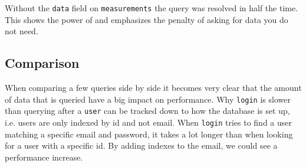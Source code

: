 Without the \verb+data+ field on \verb+measurements+ the query was resolved in half the time. 
This shows the power of  and emphasizes the penalty of asking for data you do not need.


\subsection{Comparison}
When comparing a few queries side by side it becomes very clear that the amount of data that is queried have a big impact on performance. 
Why \verb+login+ is slower than querying after a \verb+user+ can be tracked down to how the database is set up, i.e. users are only indexed by id and not email.
When \verb+login+ tries to find a user matching a specific email and password, it takes a lot longer than when looking for a user with a specific id. 
By adding indexes to the email, we could see a performance increase. 

